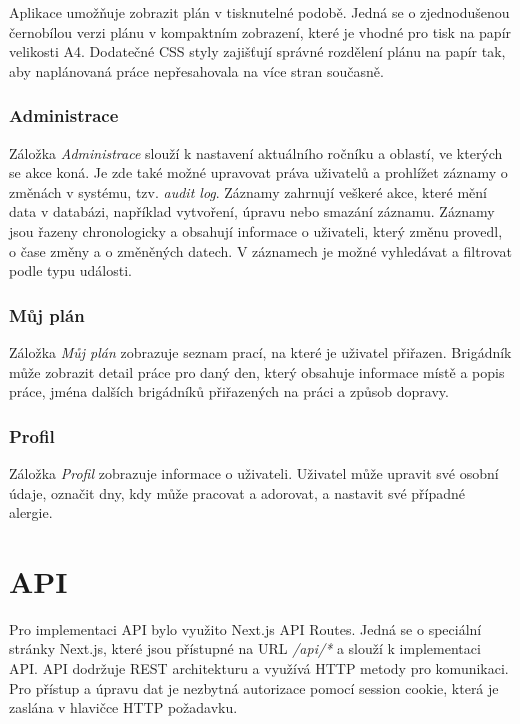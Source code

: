 Aplikace umožňuje zobrazit plán v tisknutelné podobě. Jedná se o zjednodušenou černobílou verzi plánu v kompaktním zobrazení, které je vhodné pro tisk na 
papír velikosti A4. Dodatečné CSS styly zajišťují správné rozdělení plánu na papír tak, aby naplánovaná práce nepřesahovala na více stran současně.

\subsubsection{Administrace}

Záložka \textit{Administrace} slouží k nastavení aktuálního ročníku a oblastí, ve kterých se akce koná. Je zde také možné upravovat
práva uživatelů a prohlížet záznamy o změnách v systému, tzv. \textit{audit log}. Záznamy zahrnují veškeré akce, které mění data v databázi,
například vytvoření, úpravu nebo smazání záznamu. Záznamy jsou řazeny chronologicky a obsahují informace o uživateli, který změnu provedl,
o čase změny a o změněných datech. V záznamech je možné vyhledávat a filtrovat podle typu události.

\subsubsection{Můj plán}

Záložka \textit{Můj plán} zobrazuje seznam prací, na které je uživatel přiřazen. Brigádník může zobrazit detail práce pro daný den,
který obsahuje informace místě a popis práce, jména dalších brigádníků přiřazených na práci a způsob dopravy.

\subsubsection{Profil}

Záložka \textit{Profil} zobrazuje informace o uživateli. Uživatel může upravit své osobní údaje, označit dny, kdy může pracovat a adorovat,
a nastavit své případné alergie.

\section{API}

Pro implementaci API bylo využito Next.js API Routes. Jedná se o speciální stránky Next.js, které jsou přístupné na URL \textit{/api/*} a slouží k implementaci API.
API dodržuje REST architekturu a využívá HTTP metody pro komunikaci. Pro přístup a úpravu dat je nezbytná autorizace pomocí session cookie, která je zaslána v hlavičce HTTP požadavku.

